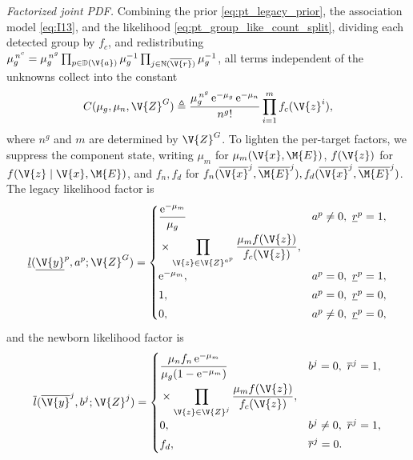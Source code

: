 \emph{Factorized joint \ac{PDF}.} Combining the prior \eqref{eq:pt_legacy_prior}, the association model \eqref{eq:I13}, and the likelihood \eqref{eq:pt_group_like_count_split}, dividing each detected group by \(f_c\), and redistributing \(\mucgroup^{\,n^c}=\mucgroup^{\,n^g}\prod_{p\in\mathbb{D}(\V{a})}\mucgroup^{-1}\prod_{j\in\mathbb{N}(\overline{\V{r}})}\mucgroup^{-1}\), all terms independent of the unknowns collect into the constant
\begin{equation}
C(\mucgroup,\mu_n,\V{Z}^{G})
\triangleq
\frac{\mucgroup^{\,n^g}\,\mathrm e^{-\mucgroup}\,\mathrm e^{-\mu_n}}{n^g!}
\prod_{i=1}^{m} f_c(\V{z}^{i}),
\label{eq:pt_constant_C}
\end{equation}
where \(n^g\) and \(m\) are determined by \(\V{Z}^{G}\). To lighten the per-target factors, we suppress the component state, writing \(\mu_m\) for \(\mu_m(\V{x},\M{E})\), \(f(\V{z})\) for \(f(\V{z}\mid\V{x},\M{E})\), and \(f_n,f_d\) for \(f_n(\overline{\V{x}}^{j},\overline{\M{E}}^{j}),f_d(\overline{\V{x}}^{j},\overline{\M{E}}^{j})\). The legacy likelihood factor is
\begin{equation}
\underline{l}(\underline{\V{y}}^{p},a^{p};\V{Z}^{G})
=
\begin{cases}
\begin{aligned}[t]
&\dfrac{\mathrm e^{-\mu_m}}{\mucgroup}\\
&\times\prod_{\V{z}\in\V{Z}^{a^{p}}}\dfrac{\mu_m f(\V{z})}{f_c(\V{z})},
\end{aligned}
& a^{p}\neq 0,\ \underline{r}^{p}=1,\\[1.2ex]
\mathrm e^{-\mu_m}, & a^{p}=0,\ \underline{r}^{p}=1,\\[0.6ex]
1, & a^{p}=0,\ \underline{r}^{p}=0,\\[0.6ex]
0, & a^{p}\neq 0,\ \underline{r}^{p}=0,
\end{cases}
\label{eq:legacy_l_function}
\end{equation}
and the newborn likelihood factor is
\begin{equation}
\overline{l}(\overline{\V{y}}^{j},b^{j};\V{Z}^{j})
=
\begin{cases}
\begin{aligned}[t]
&\dfrac{\mu_n f_n\,\mathrm e^{-\mu_m}}{\mucgroup(1-\mathrm e^{-\mu_m})}\\
&\times\prod_{\V{z}\in\V{Z}^{j}}\dfrac{\mu_m f(\V{z})}{f_c(\V{z})},
\end{aligned}
& b^{j}=0,\ \overline{r}^{j}=1,\\[1.2ex]
0, & b^{j}\neq 0,\ \overline{r}^{j}=1,\\[0.6ex]
f_d, & \overline{r}^{j}=0.
\end{cases}
\label{eq:new_l_function}
\end{equation}
